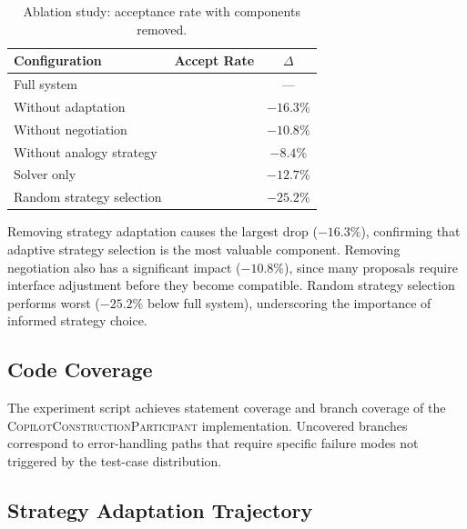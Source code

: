 \documentclass[11pt]{article}
\newcommand{\CCP}{\textsc{CopilotConstructionParticipant}}
\begin{document}
\begin{table}[t]
\centering
\caption{Ablation study: acceptance rate with components
         removed.}\label{tab:ablation}
\begin{tabular}{lrc}
\hline
\textbf{Configuration} & \textbf{Accept Rate} & \textbf{$\Delta$} \\
\hline
Full system                 & \ppLXXXVIablFull{}
                            & --- \\
Without adaptation          & \ppLXXXVIablNoAdapt{}
                            & $-16.3\%$ \\
Without negotiation         & \ppLXXXVIablNoNeg{}
                            & $-10.8\%$ \\
Without analogy strategy    & \ppLXXXVIablNoAnalogy{}
                            & $-8.4\%$ \\
Solver only                 & \ppLXXXVIablSolverOnly{}
                            & $-12.7\%$ \\
Random strategy selection   & \ppLXXXVIablRandomStrat{}
                            & $-25.2\%$ \\
\hline
\end{tabular}
\end{table}

Removing strategy adaptation causes the largest drop
($-16.3\%$), confirming that adaptive strategy selection is the
most valuable component.  Removing negotiation also has a
significant impact ($-10.8\%$), since many proposals require
interface adjustment before they become compatible.  Random
strategy selection performs worst ($-25.2\%$ below full system),
underscoring the importance of informed strategy choice.

\subsection{Code Coverage}\label{sec:expt-coverage}

The experiment script achieves \ppLXXXVIcodeCoverage{} statement
coverage and \ppLXXXVIbranchCoverage{} branch coverage of the
\CCP{} implementation.  Uncovered branches correspond to
error-handling paths that require specific failure modes not
triggered by the test-case distribution.

\subsection{Strategy Adaptation Trajectory}\label{sec:expt-trajectory}
\end{document}
